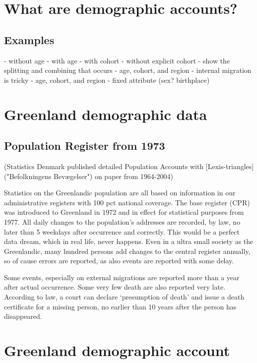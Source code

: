 \documentclass[USenglish]{article}
\begin{document}
\section{What are demographic accounts?}

\subsection{Examples}




- without age
- with age
   - with cohort
   - without explicit cohort
- show the splitting and combining that occurs   
- age, cohort, and region
   - internal migration is tricky
- age, cohort, and region - fixed attribute (sex? birthplace)



\section{Greenland demographic data}

\subsection{Population Register from 1973} 

(Statistics Denmark published detailed Population Accounts with [Lexis-triangles]("Befolkningens Bevægelser") on paper from 1964-2004)

Statistics on the Greenlandic population are all based on information in our administrative registers with 100 pct national coverage. The base register (CPR) was introduced to Greenland in 1972 and in effect for statistical purposes from 1977. All daily changes to the population’s addresses are recorded, by law, no later than 5 weekdays after occurrence and correctly. This would be a perfect data dream, which in real life, never happens. Even in a ultra small society as the Greenlandic, many hundred persons add changes to the central register annually, so of cause errors are reported, as also events are reported with some delay.

Some events, especially on external migrations are reported more than a year after actual occurrence. Some very few death are also reported very late. According to law, a court can declare ‘presumption of death’ and issue a death certificate for a missing person, no earlier than 10 years after the person has disappeared.



\section{Greenland demographic account}
\end{document}
